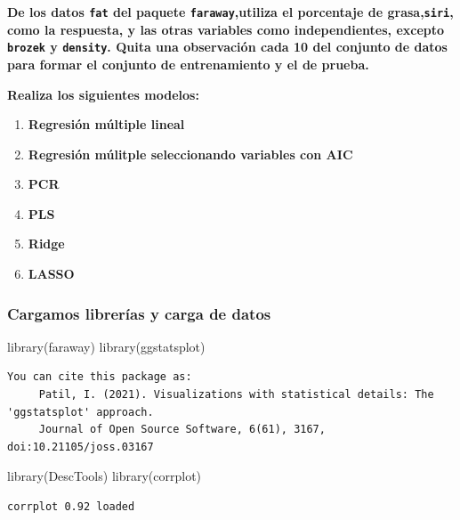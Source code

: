 \documentclass[
  letterpaper,
  DIV=11,
  numbers=noendperiod]{scrartcl}
\newenvironment{Shaded}{\begin{snugshade}}{\end{snugshade}}
\newcommand{\FunctionTok}[1]{\textcolor[rgb]{0.28,0.35,0.67}{#1}}
\newcommand{\NormalTok}[1]{\textcolor[rgb]{0.00,0.23,0.31}{#1}}
\providecommand{\tightlist}{%
  \setlength{\itemsep}{0pt}\setlength{\parskip}{0pt}}\usepackage{longtable,booktabs,array}
\begin{document}
\textbf{De los datos \texttt{fat} del paquete \texttt{faraway},utiliza
el porcentaje de grasa,\texttt{siri}, como la respuesta, y las otras
variables como independientes, excepto \texttt{brozek} y
\texttt{density}. Quita una observación cada 10 del conjunto de datos
para formar el conjunto de entrenamiento y el de prueba.}

\textbf{Realiza los siguientes modelos:}

\begin{enumerate}
\def\labelenumi{\arabic{enumi}.}
\tightlist
\item
  \textbf{Regresión múltiple lineal}
\item
  \textbf{Regresión múlitple seleccionando variables con AIC}
\item
  \textbf{PCR}
\item
  \textbf{PLS}
\item
  \textbf{Ridge}
\item
  \textbf{LASSO}
\end{enumerate}

\hypertarget{cargamos-libreruxedas-y-carga-de-datos}{%
\subsubsection{Cargamos librerías y carga de
datos}\label{cargamos-libreruxedas-y-carga-de-datos}}

\begin{Shaded}
\begin{Highlighting}[]
\FunctionTok{library}\NormalTok{(faraway)}
\FunctionTok{library}\NormalTok{(ggstatsplot)}
\end{Highlighting}
\end{Shaded}

\begin{verbatim}
You can cite this package as:
     Patil, I. (2021). Visualizations with statistical details: The 'ggstatsplot' approach.
     Journal of Open Source Software, 6(61), 3167, doi:10.21105/joss.03167
\end{verbatim}

\begin{Shaded}
\begin{Highlighting}[]
\FunctionTok{library}\NormalTok{(DescTools)}
\FunctionTok{library}\NormalTok{(corrplot)}
\end{Highlighting}
\end{Shaded}

\begin{verbatim}
corrplot 0.92 loaded
\end{verbatim}
\end{document}
